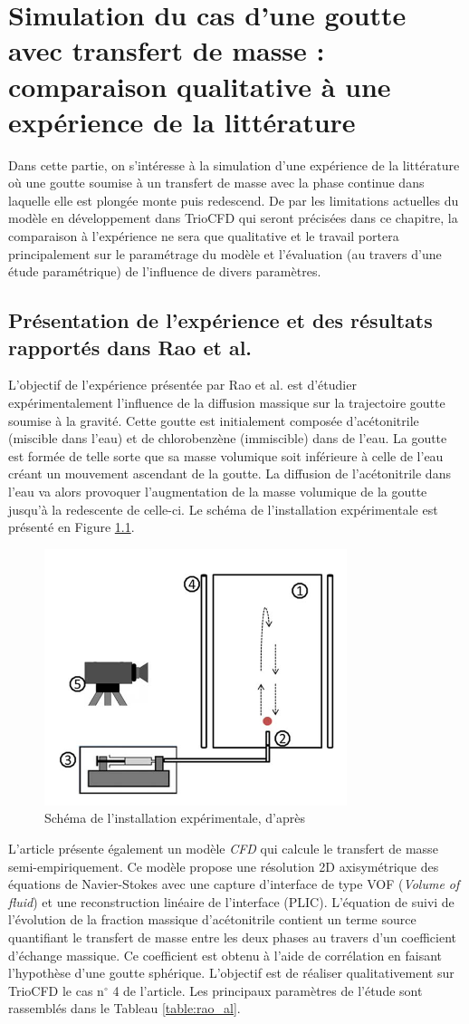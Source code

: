 \chapter{Simulation du cas d'une goutte avec transfert de masse : comparaison qualitative à une expérience de la littérature}

Dans cette partie, on s'intéresse à la simulation d'une expérience de la littérature où une goutte soumise à un transfert de masse avec la phase continue dans laquelle elle est plongée monte puis redescend. De par les limitations actuelles du modèle en développement dans TrioCFD qui seront précisées dans ce chapitre, la comparaison à l'expérience ne sera que qualitative et le travail portera principalement sur le paramétrage du modèle et l'évaluation (au travers d'une étude paramétrique) de l'influence de divers paramètres.


\section{Présentation de l'expérience et des résultats rapportés dans Rao et al.  \cite{rao_influence_2015}} \label{sec:presExp}
L'objectif de l'expérience présentée par Rao et al. est d'étudier expérimentalement l'influence de la diffusion massique sur la trajectoire goutte soumise à la gravité. Cette goutte est initialement composée d'acétonitrile (miscible dans l'eau) et de chlorobenzène (immiscible) dans de l'eau. La goutte est formée de telle sorte que sa masse volumique soit inférieure à celle de l'eau créant un mouvement ascendant de la goutte. La diffusion de l'acétonitrile dans l'eau va alors provoquer l'augmentation de la masse volumique de la goutte jusqu'à la redescente de celle-ci. Le schéma de l'installation expérimentale est présenté en Figure \ref{fig:exp}.
\begin{figure}[H]
	\centering
	\includegraphics[width=0.3\linewidth]{figure/exp}
	\caption{Schéma de l'installation expérimentale, d'après \cite{rao_influence_2015}}
	\label{fig:exp}
\end{figure}
L'article présente également un modèle \textit{CFD} qui calcule le transfert de masse semi-empiriquement. Ce modèle propose une résolution 2D axisymétrique des équations de Navier-Stokes avec une capture d'interface de type VOF (\textit{Volume of fluid}) et une reconstruction linéaire de l'interface (PLIC). L'équation de suivi de l'évolution de la fraction massique d'acétonitrile contient un terme source quantifiant le transfert de masse entre les deux phases au travers d'un coefficient d'échange massique. Ce coefficient est obtenu à l'aide de corrélation en faisant l'hypothèse d'une goutte sphérique. L'objectif est de réaliser qualitativement sur TrioCFD le cas n$^\circ$ 4 de l'article. Les principaux paramètres de l'étude sont rassemblés dans le Tableau \ref{table:rao_al}.


